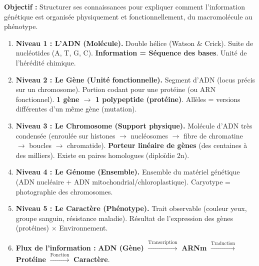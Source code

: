 \documentclass[11pt]{article}
\begin{document}
\begin{methode}
\textbf{Objectif :} Structurer ses connaissances pour expliquer comment l'information génétique est organisée physiquement et fonctionnellement, du macromolécule au phénotype.
\begin{enumerate}
    \item \textbf{Niveau 1 : L'ADN (Molécule).} Double hélice (Watson \& Crick). Suite de nucléotides (A, T, G, C). \textbf{Information = Séquence des bases}. Unité de l'hérédité chimique.
    \item \textbf{Niveau 2 : Le Gène (Unité fonctionnelle).} Segment d'ADN (locus précis sur un chromosome). Portion codant pour une protéine (ou ARN fonctionnel). \textbf{1 gène $\rightarrow$ 1 polypeptide (protéine)}. Allèles = versions différentes d'un même gène (mutation).
    \item \textbf{Niveau 3 : Le Chromosome (Support physique).} Molécule d'ADN très condensée (enroulée sur histones $\rightarrow$ nucléosomes $\rightarrow$ fibre de chromatine $\rightarrow$ boucles $\rightarrow$ chromatide). \textbf{Porteur linéaire de gènes} (des centaines à des milliers). Existe en paires homologues (diploïdie 2n).
    \item \textbf{Niveau 4 : Le Génome (Ensemble).} Ensemble du matériel génétique (ADN nucléaire + ADN mitochondrial/chloroplastique). Caryotype = photographie des chromosomes.
    \item \textbf{Niveau 5 : Le Caractère (Phénotype).} Trait observable (couleur yeux, groupe sanguin, résistance maladie). Résultat de l'expression des gènes (protéines) $\times$ Environnement.
    \item \textbf{Flux de l'information :} \textbf{ADN (Gène)} $\xrightarrow{\text{Transcription}}$ \textbf{ARNm} $\xrightarrow{\text{Traduction}}$ \textbf{Protéine} $\xrightarrow{\text{Fonction}}$ \textbf{Caractère}.
\end{enumerate}
\end{methode}
\end{document}
